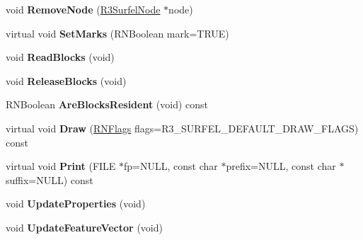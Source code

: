 \begin{DoxyCompactItemize}
\item 
void {\bfseries Remove\+Node} (\hyperlink{class_r3_surfel_node}{R3\+Surfel\+Node} $\ast$node)\hypertarget{class_r3_surfel_object_afe905d363f5b21f7e8a3ab561f744817}{}\label{class_r3_surfel_object_afe905d363f5b21f7e8a3ab561f744817}

\item 
virtual void {\bfseries Set\+Marks} (R\+N\+Boolean mark=T\+R\+UE)\hypertarget{class_r3_surfel_object_a3d35f466cca7cafb917269f63b783449}{}\label{class_r3_surfel_object_a3d35f466cca7cafb917269f63b783449}

\item 
void {\bfseries Read\+Blocks} (void)\hypertarget{class_r3_surfel_object_ac3a96e7dc237c1f0dc9b29585b4ee8f4}{}\label{class_r3_surfel_object_ac3a96e7dc237c1f0dc9b29585b4ee8f4}

\item 
void {\bfseries Release\+Blocks} (void)\hypertarget{class_r3_surfel_object_a3f963a9d90c2e53b87dec2551646300f}{}\label{class_r3_surfel_object_a3f963a9d90c2e53b87dec2551646300f}

\item 
R\+N\+Boolean {\bfseries Are\+Blocks\+Resident} (void) const \hypertarget{class_r3_surfel_object_a821746196e0017e5db7184b92eddc097}{}\label{class_r3_surfel_object_a821746196e0017e5db7184b92eddc097}

\item 
virtual void {\bfseries Draw} (\hyperlink{class_r_n_flags}{R\+N\+Flags} flags=R3\+\_\+\+S\+U\+R\+F\+E\+L\+\_\+\+D\+E\+F\+A\+U\+L\+T\+\_\+\+D\+R\+A\+W\+\_\+\+F\+L\+A\+GS) const \hypertarget{class_r3_surfel_object_aafd3a5eb4ff48aed61cc434195be9ed0}{}\label{class_r3_surfel_object_aafd3a5eb4ff48aed61cc434195be9ed0}

\item 
virtual void {\bfseries Print} (F\+I\+LE $\ast$fp=N\+U\+LL, const char $\ast$prefix=N\+U\+LL, const char $\ast$suffix=N\+U\+LL) const \hypertarget{class_r3_surfel_object_aa3b60e989766ebef39dfc2afb7a3c9b8}{}\label{class_r3_surfel_object_aa3b60e989766ebef39dfc2afb7a3c9b8}

\item 
void {\bfseries Update\+Properties} (void)\hypertarget{class_r3_surfel_object_a35407323de4b9e6f0d769044735a3185}{}\label{class_r3_surfel_object_a35407323de4b9e6f0d769044735a3185}

\item 
void {\bfseries Update\+Feature\+Vector} (void)\hypertarget{class_r3_surfel_object_afa9974f2dfe1b2c6ac663b6df17ac583}{}\label{class_r3_surfel_object_afa9974f2dfe1b2c6ac663b6df17ac583}


\end{DoxyCompactItemize}
